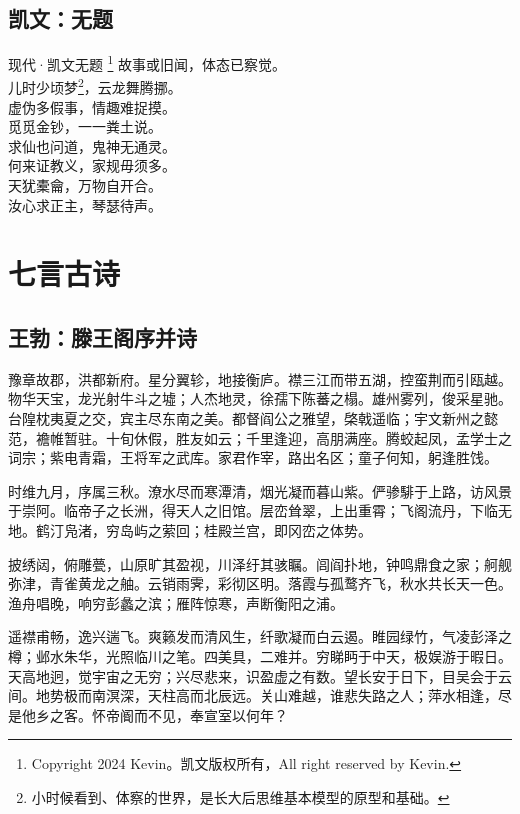 \documentclass[12pt,oneside,a5paper]{book}
\begin{document}
\chapter*{凯文：无题}
\begin{poemzh}{现代·凯文}{无题}
\footnote[0]{Copyright 2024 Kevin。凯文版权所有，All right reserved by Kevin.}
故事或旧闻，体态已察觉。\\
儿时少顷梦\footnote[1]{小时候看到、体察的世界，是长大后思维基本模型的原型和基础。}，云龙舞腾挪。\\
虚伪多假事，情趣难捉摸。\\
觅觅金钞，一一粪土说。\\
求仙也问道，鬼神无通灵。\\
何来证教义，家规毋须多。\\
天犹橐龠，万物自开合。\\
汝心求正主，琴瑟待声。\\
\end{poemzh}

\part{七言古诗}

\chapter{王勃：滕王阁序并诗}

豫章故郡，洪都新府。星分翼轸，地接衡庐。襟三江而带五湖，控蛮荆而引瓯越。物华天宝，龙光射牛斗之墟；人杰地灵，徐孺下陈蕃之榻。雄州雾列，俊采星驰。台隍枕夷夏之交，宾主尽东南之美。都督阎公之雅望，棨戟遥临；宇文新州之懿范，襜帷暂驻。十旬休假，胜友如云；千里逢迎，高朋满座。腾蛟起凤，孟学士之词宗；紫电青霜，王将军之武库。家君作宰，路出名区；童子何知，躬逢胜饯。

时维九月，序属三秋。潦水尽而寒潭清，烟光凝而暮山紫。俨骖騑于上路，访风景于崇阿。临帝子之长洲，得天人之旧馆。层峦耸翠，上出重霄；飞阁流丹，下临无地。鹤汀凫渚，穷岛屿之萦回；桂殿兰宫，即冈峦之体势。

披绣闼，俯雕甍，山原旷其盈视，川泽纡其骇瞩。闾阎扑地，钟鸣鼎食之家；舸舰弥津，青雀黄龙之舳。云销雨霁，彩彻区明。落霞与孤鹜齐飞，秋水共长天一色。渔舟唱晚，响穷彭蠡之滨；雁阵惊寒，声断衡阳之浦。

遥襟甫畅，逸兴遄飞。爽籁发而清风生，纤歌凝而白云遏。睢园绿竹，气凌彭泽之樽；邺水朱华，光照临川之笔。四美具，二难并。穷睇眄于中天，极娱游于暇日。天高地迥，觉宇宙之无穷；兴尽悲来，识盈虚之有数。望长安于日下，目吴会于云间。地势极而南溟深，天柱高而北辰远。关山难越，谁悲失路之人；萍水相逢，尽是他乡之客。怀帝阍而不见，奉宣室以何年？
\end{document}
